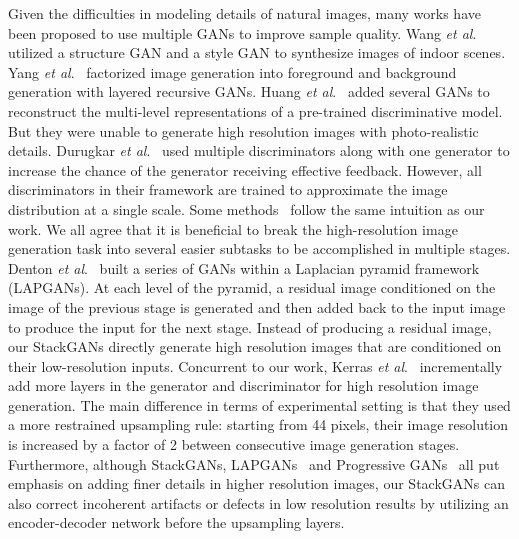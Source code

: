 \documentclass[10pt,journal,letterpaper,compsoc]{IEEEtran}
\begin{document}
{
Given the difficulties in modeling details of natural images, many works have been proposed to use multiple GANs to improve sample quality. Wang \emph{et al}.~\cite{WangG16} utilized a structure GAN and a style GAN to synthesize images of indoor scenes. Yang \emph{et al}.~\cite{YangKBP17} factorized image generation into foreground and background generation with layered recursive GANs. Huang \emph{et al}.~\cite{huang2016sgan} added several GANs to reconstruct the multi-level representations of a pre-trained discriminative model. But they were unable to generate high resolution images with photo-realistic details. Durugkar \emph{et al}.~\cite{DurugkarGM17} used multiple discriminators along with one generator to increase the chance of the generator receiving effective feedback. However, all discriminators in their framework are trained to approximate the image distribution at a single scale. Some methods~\cite{DentonCSF15,KarrasALL18} follow the same intuition as our work. We all agree that it is beneficial to break the high-resolution image generation task into several easier subtasks to be accomplished in multiple stages. Denton \emph{et al}.~\cite{DentonCSF15} built a series of GANs within a Laplacian pyramid framework (LAPGANs). At each level of the pyramid, a residual image conditioned on the image of the previous stage is generated and then added back to the input image to produce the input for the next stage. Instead of producing a residual image, our StackGANs directly generate high resolution images that are conditioned on their low-resolution inputs. Concurrent to our work, Kerras \emph{et al}.~\cite{KarrasALL18} incrementally add more layers in the generator and discriminator for high resolution image generation. The main difference in terms of experimental setting is that they used a more restrained upsampling rule: starting from 44 pixels, their image resolution is increased by a factor of 2 between consecutive image generation stages.  Furthermore, although StackGANs, LAPGANs~\cite{DentonCSF15} and Progressive GANs~\cite{KarrasALL18} all put emphasis on adding finer details in higher resolution images, our StackGANs can also correct incoherent artifacts or defects in low resolution results by utilizing an encoder-decoder network before the upsampling layers. 
}
\end{document}
